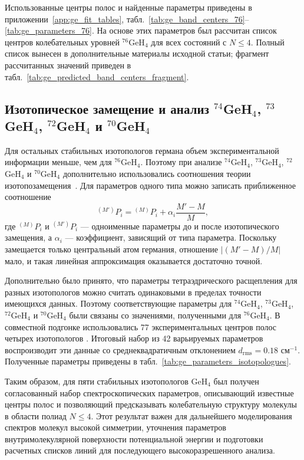 Использованные центры полос и найденные параметры приведены в приложении~\ref{app:ge_fit_tables},
табл.~\ref{tab:ge_band_centers_76}--\ref{tab:ge_parameters_76}. На основе этих параметров был рассчитан
список центров колебательных уровней ${}^{76}$GeH$_4$ для всех состояний с $N\leq4$. Полный список
вынесен в дополнительные материалы исходной статьи; фрагмент рассчитанных значений приведен в
табл.~\ref{tab:ge_predicted_band_centers_fragment}.

\subsection{Изотопическое замещение и анализ ${}^{74}$GeH$_4$, ${}^{73}$GeH$_4$, ${}^{72}$GeH$_4$ и ${}^{70}$GeH$_4$}

Для остальных стабильных изотопологов германа объем экспериментальной информации меньше, чем для
${}^{76}$GeH$_4$. Поэтому при анализе ${}^{74}$GeH$_4$, ${}^{73}$GeH$_4$, ${}^{72}$GeH$_4$ и
${}^{70}$GeH$_4$ дополнительно использовались соотношения теории изотопозамещения~\cite{byk}. Для
параметров одного типа можно записать приближенное соотношение
\begin{equation}
{}^{(M')}P_i={}^{(M)}P_i+\alpha_i\frac{M'-M}{M},
\label{eq:ge_isotope_parameter_relation}
\end{equation}
где ${}^{(M)}P_i$ и ${}^{(M')}P_i$ --- одноименные параметры до и после изотопического замещения, а
$\alpha_i$ --- коэффициент, зависящий от типа параметра. Поскольку замещается только центральный атом
германия, отношение $|(M'-M)/M|$ мало, и такая линейная аппроксимация оказывается достаточно точной.

Дополнительно было принято, что параметры тетраэдрического расщепления для разных изотопологов можно
считать одинаковыми в пределах точности имеющихся данных. Поэтому соответствующие параметры для
${}^{74}$GeH$_4$, ${}^{73}$GeH$_4$, ${}^{72}$GeH$_4$ и ${}^{70}$GeH$_4$ были связаны со значениями,
полученными для ${}^{76}$GeH$_4$. В совместной подгонке использовались 77 экспериментальных центров
полос четырех изотопологов \cite{871,872,873,877,878,879,880,881,882,883}. Итоговый набор из 42
варьируемых параметров воспроизводит эти данные со среднеквадратичным отклонением
$d_{\textrm{rms}}=0.18$ см$^{-1}$. Полученные параметры приведены в
табл.~\ref{tab:ge_parameters_isotopologues}.

Таким образом, для пяти стабильных изотопологов GeH$_4$ был получен согласованный набор
спектроскопических параметров, описывающий известные центры полос и позволяющий предсказывать
колебательную структуру молекулы в области полиад $N\leq4$. Этот результат важен для дальнейшего
моделирования спектров молекул высокой симметрии, уточнения параметров внутримолекулярной
поверхности потенциальной энергии и подготовки расчетных списков линий для последующего
высокоразрешенного анализа.


